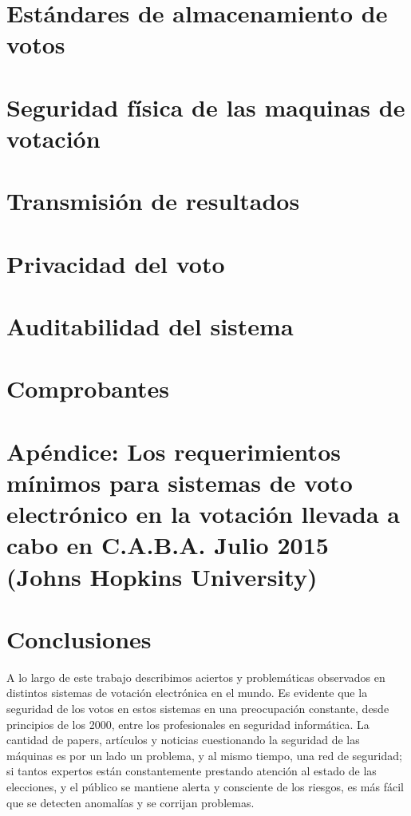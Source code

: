 \documentclass[11pt]{article}
\begin{document}
\pagebreak
\section{Estándares de almacenamiento de votos}


\pagebreak
\section{Seguridad física de las maquinas de votación}


\pagebreak
\section{Transmisión de resultados}


\pagebreak
\section{Privacidad del voto}



\pagebreak
\section{Auditabilidad del sistema}


\pagebreak
\section{Comprobantes}


\pagebreak
\section{Apéndice: Los requerimientos mínimos para sistemas de voto electrónico en la votación llevada a cabo en C.A.B.A. Julio 2015 (Johns Hopkins University)}


\pagebreak
\section{Conclusiones}
A lo largo de este trabajo describimos aciertos y problemáticas observados en distintos sistemas de votación electrónica en el mundo. Es evidente que la seguridad de los votos en estos sistemas en una preocupación constante, desde principios de los 2000, entre los profesionales en seguridad informática. La cantidad de papers, artículos y noticias cuestionando la seguridad de las máquinas es por un lado un problema, y al mismo tiempo, una red de seguridad; si tantos expertos están constantemente prestando atención al estado de las elecciones, y el público se mantiene alerta y consciente de los riesgos, es más fácil que se detecten anomalías y se corrijan problemas.
\end{document}
